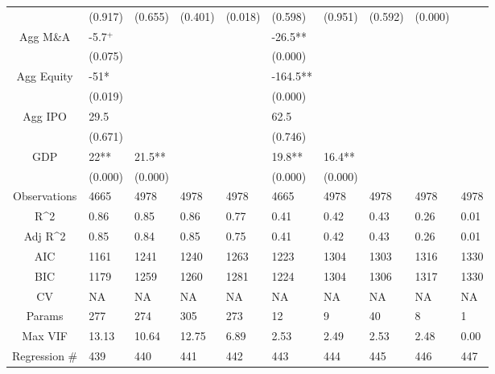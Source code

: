 \documentclass{article}
\begin{document}
\begin{table}[H]
\begin{tabular}{|clllllllll|}
   & (0.917) & (0.655) & (0.401) & (0.018) & (0.598) & (0.951) & (0.592) & (0.000) &  \\ 
  Agg M\&A & -5.7$^{+}$ &  &  &  & -26.5** &  &  &  &  \\ 
   & (0.075) &  &  &  & (0.000) &  &  &  &  \\ 
  Agg Equity & -51* &  &  &  & -164.5** &  &  &  &  \\ 
   & (0.019) &  &  &  & (0.000) &  &  &  &  \\ 
  Agg IPO & 29.5 &  &  &  & 62.5 &  &  &  &  \\ 
   & (0.671) &  &  &  & (0.746) &  &  &  &  \\ 
  GDP & 22** & 21.5** &  &  & 19.8** & 16.4** &  &  &  \\ 
   & (0.000) & (0.000) &  &  & (0.000) & (0.000) &  &  &  \\ 
  \hline 
 Observations & 4665 & 4978 & 4978 & 4978 & 4665 & 4978 & 4978 & 4978 & 4978 \\ 
  R^2 & 0.86 & 0.85 & 0.86 & 0.77 & 0.41 & 0.42 & 0.43 & 0.26 & 0.01 \\ 
  Adj R^2 & 0.85 & 0.84 & 0.85 & 0.75 & 0.41 & 0.42 & 0.43 & 0.26 & 0.01 \\ 
  AIC & 1161 & 1241 & 1240 & 1263 & 1223 & 1304 & 1303 & 1316 & 1330 \\ 
  BIC & 1179 & 1259 & 1260 & 1281 & 1224 & 1304 & 1306 & 1317 & 1330 \\ 
  CV & NA & NA & NA & NA & NA & NA & NA & NA & NA \\ 
  Params & 277 & 274 & 305 & 273 & 12 & 9 & 40 & 8 & 1 \\ 
  Max VIF & 13.13 & 10.64 & 12.75 & 6.89 & 2.53 & 2.49 & 2.53 & 2.48 & 0.00 \\ 
  Regression \# & 439 & 440 & 441 & 442 & 443 & 444 & 445 & 446 & 447 \\ 
   \hline
\end{tabular}
 
\end{table}
\end{document}

